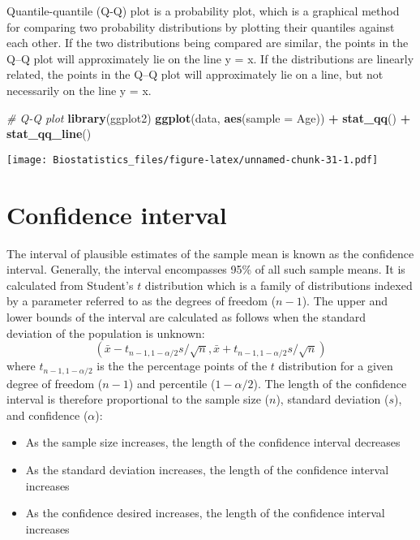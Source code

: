 \documentclass[]{book}
\newenvironment{Shaded}{\begin{snugshade}}{\end{snugshade}}
\newcommand{\KeywordTok}[1]{\textcolor[rgb]{0.13,0.29,0.53}{\textbf{#1}}}
\newcommand{\DataTypeTok}[1]{\textcolor[rgb]{0.13,0.29,0.53}{#1}}
\newcommand{\StringTok}[1]{\textcolor[rgb]{0.31,0.60,0.02}{#1}}
\newcommand{\CommentTok}[1]{\textcolor[rgb]{0.56,0.35,0.01}{\textit{#1}}}
\newcommand{\OperatorTok}[1]{\textcolor[rgb]{0.81,0.36,0.00}{\textbf{#1}}}
\newcommand{\NormalTok}[1]{#1}
\providecommand{\tightlist}{%
  \setlength{\itemsep}{0pt}\setlength{\parskip}{0pt}}
\theoremstyle{definition}
\theoremstyle{definition}
\theoremstyle{definition}
\theoremstyle{remark}
\begin{document}
Quantile-quantile (Q-Q) plot is a probability plot, which is a graphical
method for comparing two probability distributions by plotting their
quantiles against each other. If the two distributions being compared
are similar, the points in the Q--Q plot will approximately lie on the
line y = x. If the distributions are linearly related, the points in the
Q--Q plot will approximately lie on a line, but not necessarily on the
line y = x.

\begin{Shaded}
\begin{Highlighting}[]
\CommentTok{# Q-Q plot}
\KeywordTok{library}\NormalTok{(ggplot2)}
\KeywordTok{ggplot}\NormalTok{(data, }\KeywordTok{aes}\NormalTok{(}\DataTypeTok{sample =}\NormalTok{ Age)) }\OperatorTok{+}\StringTok{ }
\StringTok{  }\KeywordTok{stat_qq}\NormalTok{() }\OperatorTok{+}\StringTok{ }
\StringTok{  }\KeywordTok{stat_qq_line}\NormalTok{()}
\end{Highlighting}
\end{Shaded}

\texttt{[image: Biostatistics\_files/figure-latex/unnamed-chunk-31-1.pdf]}

\section{Confidence interval}\label{confidence-interval}

The interval of plausible estimates of the sample mean is known as the
confidence interval. Generally, the interval encompasses 95\% of all
such sample means. It is calculated from Student's \({t}\) distribution
which is a family of distributions indexed by a parameter referred to as
the degrees of freedom (\({n-1}\)). The upper and lower bounds of the
interval are calculated as follows when the standard deviation of the
population is unknown:
\[{(\bar{x}-t_{n-1,1-\alpha/2}s/\sqrt{n}, \bar{x}+t_{n-1,1-\alpha/2}s/\sqrt{n})}\]
where \(t_{n-1,1-\alpha/2}\) is the the percentage points of the \({t}\)
distribution for a given degree of freedom (\({n-1}\)) and percentile
(\(1-\alpha/2\)). The length of the confidence interval is therefore
proportional to the sample size (\({n}\)), standard deviation (\({s}\)),
and confidence (\(\alpha\)):

\begin{itemize}
\tightlist
\item
  As the sample size increases, the length of the confidence interval
  decreases
\item
  As the standard deviation increases, the length of the confidence
  interval increases
\item
  As the confidence desired increases, the length of the confidence
  interval increases
\end{itemize}
\end{document}
